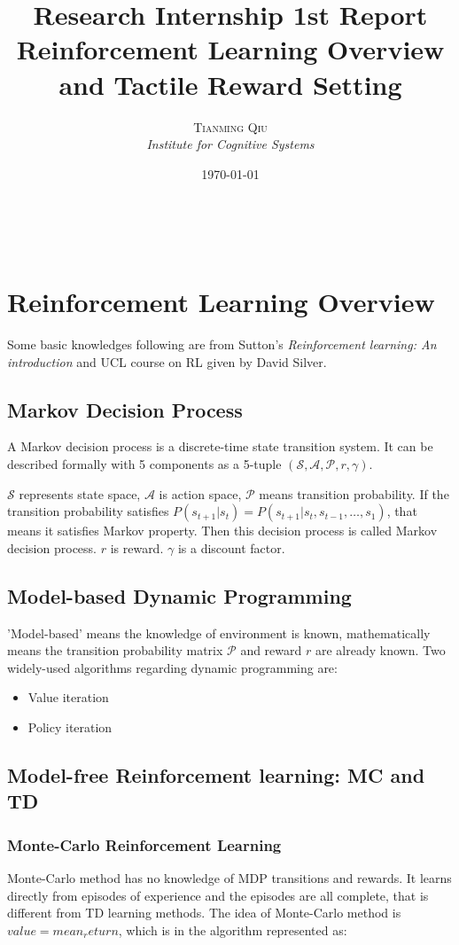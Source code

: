 \documentclass[a4paper, 11pt]{article} %
\title{\textbf{Research Internship 1st Report}\\ %
Reinforcement Learning Overview \\and Tactile Reward Setting} %
\author{\textsc{Tianming Qiu} %
\\{\textit{Institute for Cognitive Systems}}} %
\date{\today} %
\makeatletter
\renewcommand{\maketitle}{ %
\begin{flushright} %
{\LARGE\@title} %

\vspace{50pt} %

{\large\@author} %
\\\@date %

\vspace{40pt} %
\end{flushright}
}
\makeatother
\begin{document}
\maketitle %


\section{Reinforcement Learning Overview} 
Some basic knowledges following are from Sutton's \textit{Reinforcement learning: An introduction}\cite {sutton1998reinforcement} and UCL course on RL given by David Silver. 

\subsection{Markov Decision Process}
A Markov decision process is a discrete-time state transition system. It can be described formally with 5 components as a 5-tuple $(\mathcal{S,A,P}, r,\gamma)$. 

$\mathcal{S}$ represents state space, 
$\mathcal{A}$ is action space, 
$\mathcal{P}$ means transition probability. 
If the transition probability satisfies $P(s_{t+1}|s_{t})=P(s_{t+1}|s_{t},s_{t-1},\dots,s_{1})$, that means it satisfies Markov property. Then this decision process is called Markov decision process. $r$ is reward.
$\gamma$ is a discount factor.

\subsection{Model-based Dynamic Programming}
'Model-based' means the knowledge of environment is known, mathematically means the transition probability matrix $\mathcal{P}$ and reward $r$ are already known. 
Two widely-used algorithms regarding dynamic programming are:
\begin{itemize}
\item Value iteration
\item Policy iteration
\end{itemize}
\subsection{Model-free Reinforcement learning: MC and TD}
\subsubsection{Monte-Carlo Reinforcement Learning}
Monte-Carlo method has no knowledge of MDP transitions and rewards. It learns directly from episodes of experience and the episodes are all complete, that is different from TD learning methods. The idea of Monte-Carlo method is $value = mean_return$, which is in the algorithm represented as:
\vspace{3mm}
\end{document}
